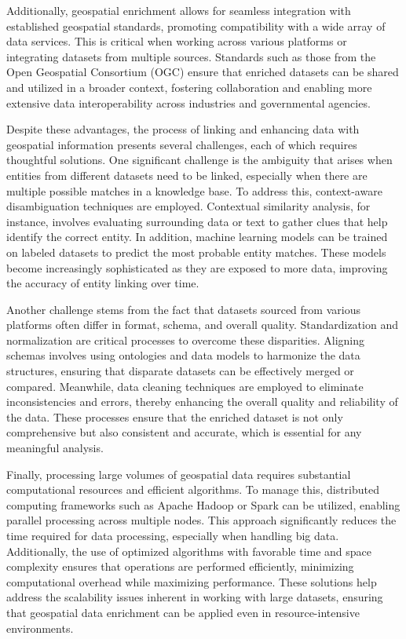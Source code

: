 Additionally, geospatial enrichment allows for seamless integration with established geospatial standards, promoting compatibility with a wide array of data services. This is critical when working across various platforms or integrating datasets from multiple sources. Standards such as those from the Open Geospatial Consortium (OGC) ensure that enriched datasets can be shared and utilized in a broader context, fostering collaboration and enabling more extensive data interoperability across industries and governmental agencies.

Despite these advantages, the process of linking and enhancing data with geospatial information presents several challenges, each of which requires thoughtful solutions. One significant challenge is the ambiguity that arises when entities from different datasets need to be linked, especially when there are multiple possible matches in a knowledge base. To address this, context-aware disambiguation techniques are employed. Contextual similarity analysis, for instance, involves evaluating surrounding data or text to gather clues that help identify the correct entity. In addition, machine learning models can be trained on labeled datasets to predict the most probable entity matches. These models become increasingly sophisticated as they are exposed to more data, improving the accuracy of entity linking over time.

Another challenge stems from the fact that datasets sourced from various platforms often differ in format, schema, and overall quality. Standardization and normalization are critical processes to overcome these disparities. Aligning schemas involves using ontologies and data models to harmonize the data structures, ensuring that disparate datasets can be effectively merged or compared. Meanwhile, data cleaning techniques are employed to eliminate inconsistencies and errors, thereby enhancing the overall quality and reliability of the data. These processes ensure that the enriched dataset is not only comprehensive but also consistent and accurate, which is essential for any meaningful analysis.

Finally, processing large volumes of geospatial data requires substantial computational resources and efficient algorithms. To manage this, distributed computing frameworks such as Apache Hadoop or Spark can be utilized, enabling parallel processing across multiple nodes. This approach significantly reduces the time required for data processing, especially when handling big data. Additionally, the use of optimized algorithms with favorable time and space complexity ensures that operations are performed efficiently, minimizing computational overhead while maximizing performance. These solutions help address the scalability issues inherent in working with large datasets, ensuring that geospatial data enrichment can be applied even in resource-intensive environments.


